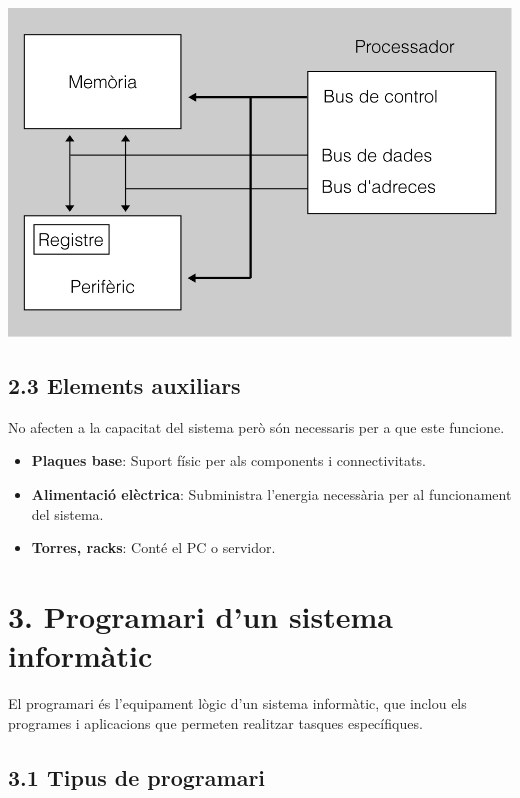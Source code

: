 \documentclass[
  12 pt,
  a4paper,
]{article}
\providecommand{\tightlist}{%
  \setlength{\itemsep}{0pt}\setlength{\parskip}{0pt}}
\begin{document}
\includegraphics{recursos/esquema.png}

\subsection{2.3 Elements auxiliars}\label{elements-auxiliars}

No afecten a la capacitat del sistema però són necessaris per a que este
funcione.

\begin{itemize}
\tightlist
\item
  \textbf{Plaques base}: Suport físic per als components i
  connectivitats.
\item
  \textbf{Alimentació elèctrica}: Subministra l'energia necessària per
  al funcionament del sistema.
\item
  \textbf{Torres, racks}: Conté el PC o servidor.
\end{itemize}

\section{3. Programari d'un sistema
informàtic}\label{programari-dun-sistema-informuxe0tic}

El programari és l'equipament lògic d'un sistema informàtic, que inclou
els programes i aplicacions que permeten realitzar tasques específiques.

\subsection{3.1 Tipus de programari}\label{tipus-de-programari}
\end{document}
